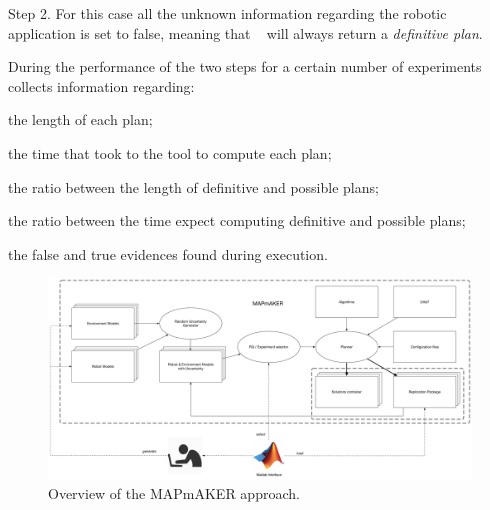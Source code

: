 Step 2. For this case all the unknown information regarding the robotic application is set to false, meaning that \toolName~ will always return a \emph{definitive plan}.

During the performance of the two steps for a certain number of experiments \toolName~ collects information regarding:
\begin{enumerate*}
\item the length of each plan;
\item the time that took to the tool to compute each plan;
\item the ratio between the length of definitive and possible plans;
\item the ratio between the time expect computing definitive and possible plans;
\item the false and true evidences found during execution.
\end{enumerate*}

\begin{figure}[!t]
\begin{center}
\includegraphics[width=1\linewidth]{Figures/MAPmAKER.pdf}
\caption{Overview of the MAPmAKER approach.}
\label{fig:overview}
\end{center}
\end{figure}





